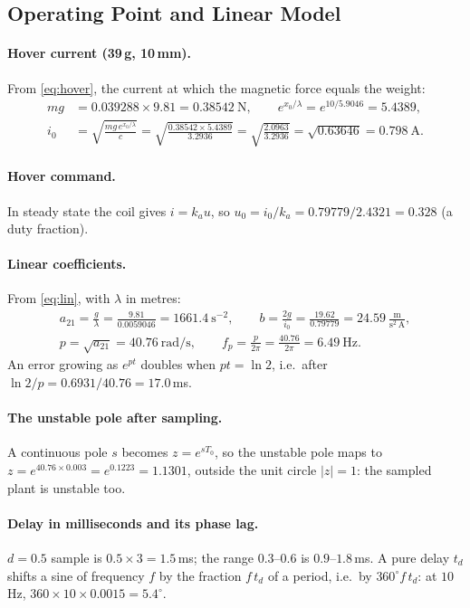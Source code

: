 \documentclass[11pt,a4paper]{article}
\begin{document}
\subsection{Operating Point and Linear Model}
\label{sec:calc-lin}
\paragraph{Hover current (39\,g, 10\,mm).} From \eqref{eq:hover}, the current at which the magnetic force equals the weight:
\begin{align*}
m g &= 0.039288 \times 9.81 = 0.38542\ \text{N}, \qquad e^{x_0/\lambda} = e^{10/5.9046} = 5.4389,\\
i_0 &= \sqrt{\frac{m g\,e^{x_0/\lambda}}{c}} = \sqrt{\frac{0.38542 \times 5.4389}{3.2936}} = \sqrt{\frac{2.0963}{3.2936}}
     = \sqrt{0.63646} = 0.798\ \text{A}.
\end{align*}
\paragraph{Hover command.} In steady state the coil gives $i = k_a u$, so $u_0 = i_0/k_a = 0.79779/2.4321 = 0.328$ (a duty
fraction).

\paragraph{Linear coefficients.} From \eqref{eq:lin}, with $\lambda$ in metres:
\begin{gather*}
a_{21} = \frac{g}{\lambda} = \frac{9.81}{0.0059046} = 1661.4\ \text{s}^{-2}, \qquad
b = \frac{2g}{i_0} = \frac{19.62}{0.79779} = 24.59\ \frac{\text{m}}{\text{s}^2\,\text{A}},\\
p = \sqrt{a_{21}} = 40.76\ \text{rad/s}, \qquad f_p = \frac{p}{2\pi} = \frac{40.76}{2\pi} = 6.49\ \text{Hz}.
\end{gather*}
An error growing as $e^{pt}$ doubles when $pt = \ln 2$, i.e.\ after $\ln 2/p = 0.6931/40.76 = 17.0$\,ms.

\paragraph{The unstable pole after sampling.} A continuous pole $s$ becomes $z = e^{sT_0}$, so the unstable pole maps to
$z = e^{40.76 \times 0.003} = e^{0.1223} = 1.1301$, outside the unit circle $|z| = 1$: the sampled plant is unstable too.

\paragraph{Delay in milliseconds and its phase lag.} $d = 0.5$ sample is $0.5 \times 3 = 1.5$\,ms; the range $0.3$--$0.6$ is
$0.9$--$1.8$\,ms. A pure delay $t_d$ shifts a sine of frequency $f$ by the fraction $f\,t_d$ of a period, i.e.\ by
$360^\circ f\,t_d$: at $10$\,Hz, $360 \times 10 \times 0.0015 = 5.4^\circ$.
\end{document}
